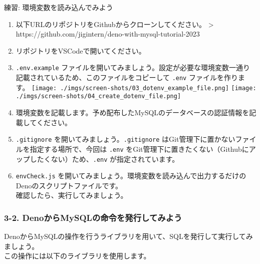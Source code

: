 練習: 環境変数を読み込んでみよう

\begin{enumerate}
\def\labelenumi{\arabic{enumi}.}
\item
  以下URLのリポジトリをGithubからクローンしてください。 \textgreater{}
  https://github.com/jigintern/deno-with-mysql-tutorial-2023
\item
  リポジトリをVSCodeで開いてください。
\item
  \texttt{.env.example}
  ファイルを開いてみましょう。設定が必要な環境変数一通り記載されているため、このファイルをコピーして
  \texttt{.env} ファイルを作ります。
  \texttt{[image: ./imgs/screen-shots/03\_dotenv\_example\_file.png]}
  \texttt{[image: ./imgs/screen-shots/04\_create\_dotenv\_file.png]}
\item
  環境変数を記載します。予め配布したMySQLのデータベースの認証情報を記載してください。
\item
  \texttt{.gitignore} を開いてみましょう。\texttt{.gitignore}
  はGit管理下に置かないファイルを指定する場所で、今回は \texttt{.env}
  をGit管理下に置きたくない（Githubにアップしたくない）ため、\texttt{.env}
  が指定されています。
\item
  \texttt{envCheck.js}
  を開いてみましょう。環境変数を読み込んで出力するだけのDenoのスクリプトファイルです。\\
  確認したら、実行してみましょう。
\end{enumerate}

\begin{Shaded}
\begin{Highlighting}[]
 
\end{Highlighting}
\end{Shaded}

\subsubsection{3-2.
DenoからMySQLの命令を発行してみよう}\label{denoux304bux3089mysqlux306eux547dux4ee4ux3092ux767aux884cux3057ux3066ux307fux3088ux3046}

DenoからMySQLの操作を行うライブラリを用いて、SQLを発行して実行してみましょう。\\
この操作には以下のライブラリを使用します。

